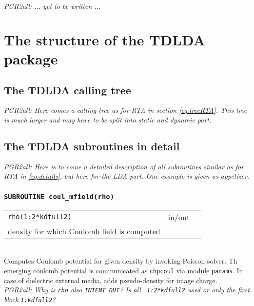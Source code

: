 \documentclass[final,1p]{elsarticle}
\newcommand{\PGRcomm}[1]{{\color{blue}\small\em PGR2all: #1}}
\begin{document}
\centerline{\PGRcomm{... yet to be written ...}}


\section{The structure of the TDLDA package}
\label{sec:TDLDAnum}


\subsection{The TDLDA calling tree}

\PGRcomm{Here comes a calling tree as for RTA in section
  \ref{eq:treeRTA}. This tree is much larger and may have to be
  split into static and dynamic part.
}

\subsection{The TDLDA subroutines in detail}
\label{eq:detailsTDLDA}


\PGRcomm{Here is to come a detailed description of all subroutines
  similar as for RTA in \ref{eq:details}, but here for the LDA part.
One example is given as appetizer.
}

\subsubsection*{\tt SUBROUTINE coul\_mfield(rho)}
\begin{tabular}{lcl}
 {\tt rho(1:2*kdfull2)} & in/out & \\ density for which Coulomb field
 is computed
\end{tabular}
\\[4pt]
Computes Coulomb potential for given density by invoking
Poisson solver.
Th emerging coulomb potential is communicated as {\tt chpcoul}
via module {\tt params}.
In case of dielectric external media, adds pseudo-density for image
charge.
\\
\PGRcomm{Why is {\tt rho} also {\tt INTENT OUT}? Is all {\tt
    1:2*kdfull2} used or only the first block {\tt 1:kdfull2}?}



\end{document}
